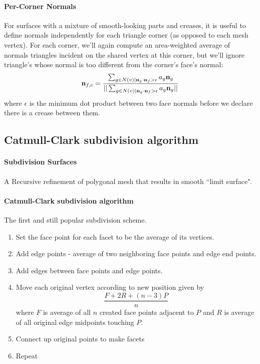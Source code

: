 \documentclass[11pt]{article}
\numberwithin{equation}{section}
\begin{document}
\paragraph{Per-Corner Normals}
For surfaces with a mixture of smooth-looking parts and creases, it is useful to define normals independently for each triangle corner (as opposed to each mesh vertex). For each corner, we'll again compute an area-weighted average of normals triangles incident on the shared vertex at this corner, but we'll ignore triangle's whose normal is too different from the corner's face's normal:
\begin{equation}
	\textbf{n}_{f,c} = \frac{\sum_{g \in N(v)|\textbf{n}_{g}\cdot \textbf{n}_{f}>\epsilon} a_g\textbf{n}_{g}}{||\sum_{g \in N(v)|\textbf{n}_{g}\cdot \textbf{n}_{f}>\epsilon} a_g\textbf{n}_{g}||}
\end{equation}
where $\epsilon$ is the minimum dot  product between two face normals before we declare there is a crease between them.


\subsection{Catmull-Clark subdivision algorithm}
\paragraph{Subdivision Surfaces}
A Recursive refinement of polygonal mesh that results in smooth 	``limit surface".

\paragraph{Catmull-Clark subdivision algorithm}
The first and still popular subdivision scheme.
\begin{enumerate}
	\item Set the face point for each facet to be the average of its vertices.
	\item Add edge points - average of two neighboring face points and edge end points.
	\item Add edges between face points and edge points.
	\item Move each original vertex according to new position given by
	$$\frac{F + 2R + (n-3)P}{n}$$
	where $F$ is average of all $n$ created face points adjacent to $P$ and $R$ is average of all original edge midpoints touching $P$.
	\item Connect up original points to make facets
	\item Repeat
	
\end{enumerate}
\end{document}
